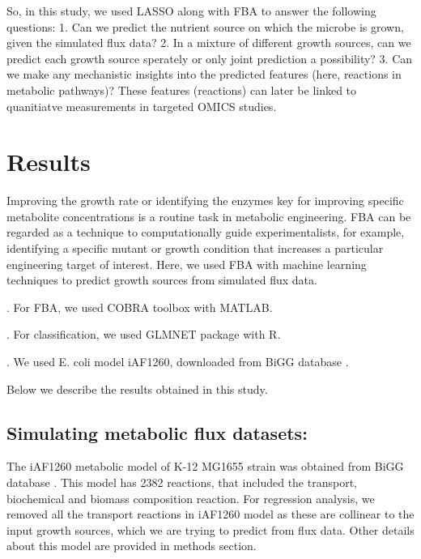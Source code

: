 \documentclass[12pt]{article}
\begin{document}
\bigskip
\noindent
So, in this study, we used LASSO \cite{Friedmanetal2010} along with FBA to answer the following questions: 1. Can we predict the nutrient source on which the microbe is grown, given the simulated flux data? 2. In a mixture of different growth sources, can we predict each growth source sperately or only joint prediction a possibility? 3. Can we make any mechanistic insights into the predicted features (here, reactions in metabolic pathways)? These features (reactions) can later be linked to quanitiatve measurements in targeted OMICS studies.


\section*{Results}

Improving the growth rate or identifying the enzymes key for improving specific metabolite concentrations is a routine task in metabolic engineering. FBA can be regarded as a technique to computationally guide experimentalists, for example, identifying a specific mutant or growth condition that increases a particular engineering target of interest. Here, we used FBA with machine learning techniques to predict growth sources from simulated flux data.

\bigskip
{}. For FBA, we used COBRA toolbox \cite{Schellenbergeretal2011} with MATLAB.

\bigskip
{}. For classification, we used GLMNET \cite{Friedmanetal2010} package with R.

\bigskip
{}. We used E. coli model iAF1260, downloaded from BiGG database \cite{Schellenbergeretal2010}.

\noindent
Below we describe the results obtained in this study.

\subsection*{Simulating metabolic flux datasets:}
The iAF1260 metabolic model of K-12 MG1655 strain was obtained from BiGG database \cite{Schellenbergeretal2010}. This model has 2382 reactions, that included the transport, biochemical and biomass composition reaction. For regression analysis, we removed all the transport reactions in iAF1260 model as these are collinear to the input growth sources, which we are trying to predict from flux data. Other details about this model are provided in methods section.
\end{document}
